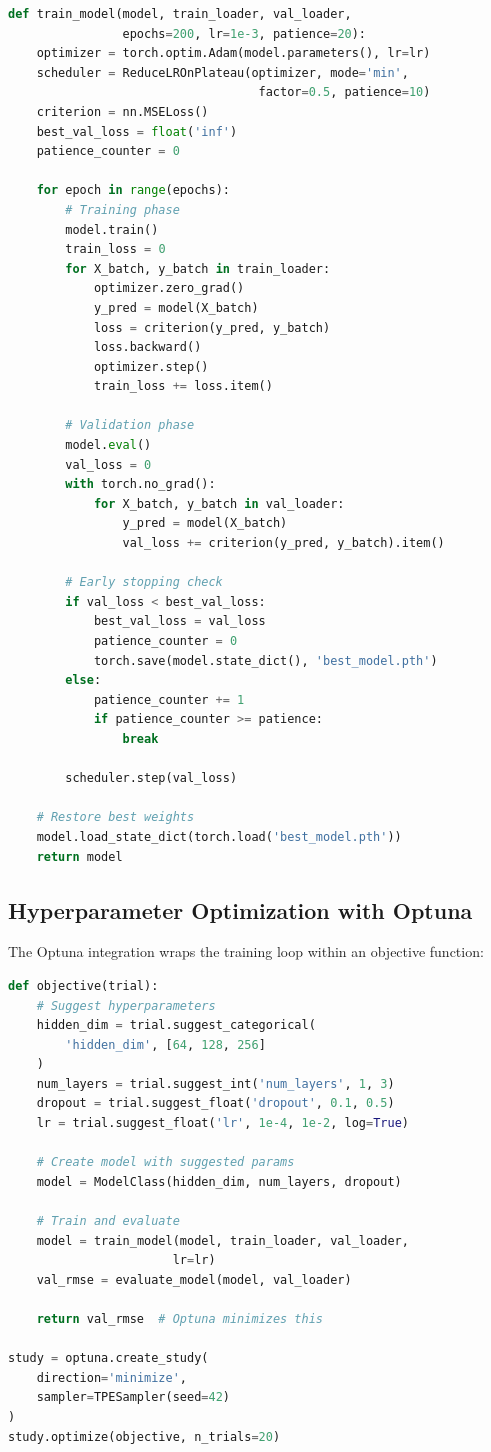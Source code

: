 \begin{lstlisting}[language=Python]
def train_model(model, train_loader, val_loader,
                epochs=200, lr=1e-3, patience=20):
    optimizer = torch.optim.Adam(model.parameters(), lr=lr)
    scheduler = ReduceLROnPlateau(optimizer, mode='min',
                                   factor=0.5, patience=10)
    criterion = nn.MSELoss()
    best_val_loss = float('inf')
    patience_counter = 0
    
    for epoch in range(epochs):
        # Training phase
        model.train()
        train_loss = 0
        for X_batch, y_batch in train_loader:
            optimizer.zero_grad()
            y_pred = model(X_batch)
            loss = criterion(y_pred, y_batch)
            loss.backward()
            optimizer.step()
            train_loss += loss.item()
        
        # Validation phase
        model.eval()
        val_loss = 0
        with torch.no_grad():
            for X_batch, y_batch in val_loader:
                y_pred = model(X_batch)
                val_loss += criterion(y_pred, y_batch).item()
        
        # Early stopping check
        if val_loss < best_val_loss:
            best_val_loss = val_loss
            patience_counter = 0
            torch.save(model.state_dict(), 'best_model.pth')
        else:
            patience_counter += 1
            if patience_counter >= patience:
                break
        
        scheduler.step(val_loss)
    
    # Restore best weights
    model.load_state_dict(torch.load('best_model.pth'))
    return model
\end{lstlisting}

\subsection{Hyperparameter Optimization with Optuna}

The Optuna integration wraps the training loop within an objective function:

\begin{lstlisting}[language=Python]
def objective(trial):
    # Suggest hyperparameters
    hidden_dim = trial.suggest_categorical(
        'hidden_dim', [64, 128, 256]
    )
    num_layers = trial.suggest_int('num_layers', 1, 3)
    dropout = trial.suggest_float('dropout', 0.1, 0.5)
    lr = trial.suggest_float('lr', 1e-4, 1e-2, log=True)
    
    # Create model with suggested params
    model = ModelClass(hidden_dim, num_layers, dropout)
    
    # Train and evaluate
    model = train_model(model, train_loader, val_loader,
                       lr=lr)
    val_rmse = evaluate_model(model, val_loader)
    
    return val_rmse  # Optuna minimizes this

study = optuna.create_study(
    direction='minimize',
    sampler=TPESampler(seed=42)
)
study.optimize(objective, n_trials=20)
\end{lstlisting}

